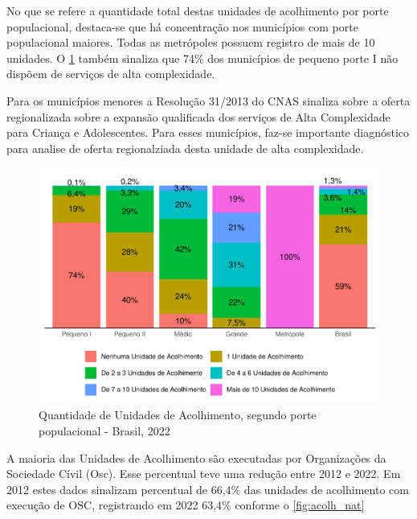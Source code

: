 \documentclass[
  brazilian]{report}
\begin{document}
No que se refere a quantidade total destas unidades de acolhimento por
porte populacional, destaca-se que há concentração nos municípios com
porte populacional maiores. Todas as metrópoles possuem registro de mais
de 10 unidades. O \cref{fig:unac-porte} também sinaliza que 74\% dos
municípios de pequeno porte I não dispõem de serviços de alta
complexidade.

Para os municípios menores a Resolução 31/2013 do CNAS sinaliza sobre a
oferta regionalizada sobre a expansão qualificada dos serviços de Alta
Complexidade para Criança e Adolescentes. Para esses municípios, faz-se
importante diagnóstico para analise de oferta regionalziada desta
unidade de alta complexidade.

\begin{figure}
\includegraphics{Censo-SUAS-2022_files/figure-latex/unac-porte-1} \caption[Quantidade de Unidades de Acolhimento, segundo porte populacional - Brasil, 2022]{Quantidade de Unidades de Acolhimento, segundo porte populacional - Brasil, 2022}\label{fig:unac-porte}
\end{figure}

A maioria das Unidades de Acolhimento são executadas por Organizações da
Sociedade Cívil (Osc). Esse percentual teve uma redução entre 2012 e
2022. Em 2012 estes dados sinalizam percentual de 66,4\% das unidades de
acolhimento com execução de OSC, registrando em 2022 63,4\% conforme o
\cref{fig:acolh_nat}
\end{document}
